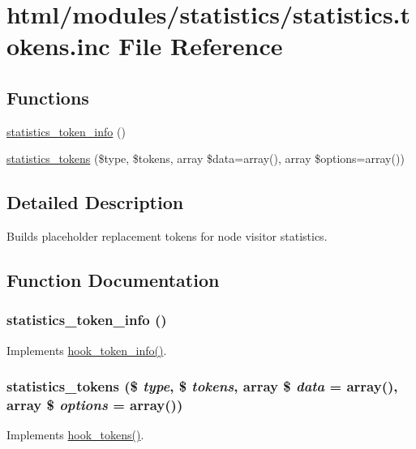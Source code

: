 \hypertarget{statistics_8tokens_8inc}{
\section{html/modules/statistics/statistics.tokens.inc File Reference}
\label{statistics_8tokens_8inc}
}
\subsection*{Functions}
\begin{DoxyCompactItemize}
\item 
\hyperlink{statistics_8tokens_8inc_ae6bb125ed202ef9c11457bab0dde67ef}{statistics\_\-token\_\-info} ()
\item 
\hyperlink{statistics_8tokens_8inc_a540885389d7ec0e70dfcb68d44e8eb7e}{statistics\_\-tokens} (\$type, \$tokens, array \$data=array(), array \$options=array())
\end{DoxyCompactItemize}


\subsection{Detailed Description}
Builds placeholder replacement tokens for node visitor statistics. 

\subsection{Function Documentation}
\hypertarget{statistics_8tokens_8inc_ae6bb125ed202ef9c11457bab0dde67ef}{
\subsubsection[{statistics\_\-token\_\-info}]{\setlength{\rightskip}{0pt plus 5cm}statistics\_\-token\_\-info ()}}
\label{statistics_8tokens_8inc_ae6bb125ed202ef9c11457bab0dde67ef}
Implements \hyperlink{group__hooks_gab868597197cf36911f95dcd29ae0b954}{hook\_\-token\_\-info()}. \hypertarget{statistics_8tokens_8inc_a540885389d7ec0e70dfcb68d44e8eb7e}{
\subsubsection[{statistics\_\-tokens}]{\setlength{\rightskip}{0pt plus 5cm}statistics\_\-tokens (\$ {\em type}, \/  \$ {\em tokens}, \/  array \$ {\em data} = {\ttfamily array()}, \/  array \$ {\em options} = {\ttfamily array()})}}
\label{statistics_8tokens_8inc_a540885389d7ec0e70dfcb68d44e8eb7e}
Implements \hyperlink{group__hooks_ga3bfd87d9a19b2397b0f970e1cff7ea4f}{hook\_\-tokens()}. 